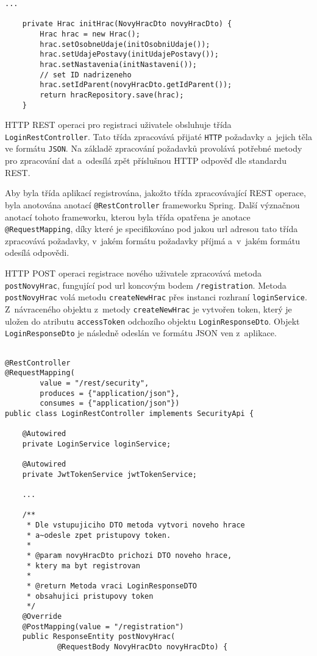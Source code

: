 \documentclass[twoside, 12pt]{article}
\begin{document}
{\begin{lstlisting}
...

    private Hrac initHrac(NovyHracDto novyHracDto) {
        Hrac hrac = new Hrac();
        hrac.setOsobneUdaje(initOsobniUdaje());
        hrac.setUdajePostavy(initUdajePostavy());
        hrac.setNastavenia(initNastaveni());
        // set ID nadrizeneho
        hrac.setIdParent(novyHracDto.getIdParent());
        return hracRepository.save(hrac);
    }
\end{lstlisting}

HTTP REST operaci pro registraci uživatele obsluhuje třída \texttt{LoginRestController}.
Tato třída zpracovává přijaté \texttt{HTTP} požadavky a~jejich těla ve formátu \texttt{JSON}.
Na základě zpracování požadavků provolává potřebné metody pro zpracování dat
a~odesílá zpět příslušnou HTTP odpověď dle standardu REST.

Aby byla třída aplikací registrována, jakožto třída zpracovávající REST operace,
byla anotována anotací \texttt{@RestController} frameworku Spring.
Další význačnou anotací tohoto frameworku, kterou byla třída opatřena je anotace \texttt{@RequestMapping},
díky které je specifikováno pod jakou url adresou tato třída zpracovává požadavky,
v~jakém formátu požadavky příjmá a~v~jakém formátu odesílá odpovědi.

HTTP POST operaci registrace nového uživatele zpracovává metoda \texttt{postNovyHrac},
fungující pod url koncovým bodem \texttt{/registration}.
Metoda \texttt{postNovyHrac} volá metodu \texttt{createNewHrac} přes instanci rozhraní \texttt{loginService}.
Z~návraceného objektu z~metody \texttt{createNewHrac} je vytvořen token,
který je uložen do atributu \texttt{accessToken} odchozího objektu \texttt{LoginResponseDto}.
Objekt \texttt{LoginResponseDto} je následně odeslán ve formátu JSON ven z~aplikace.

\clearpage

\begin{lstlisting}

@RestController
@RequestMapping(
        value = "/rest/security",
        produces = {"application/json"},
        consumes = {"application/json"})
public class LoginRestController implements SecurityApi {

    @Autowired
    private LoginService loginService;

    @Autowired
    private JwtTokenService jwtTokenService;

    ...

    /**
     * Dle vstupujiciho DTO metoda vytvori noveho hrace
     * a~odesle zpet pristupovy token.
     *
     * @param novyHracDto prichozi DTO noveho hrace,
     * ktery ma byt registrovan
     *
     * @return Metoda vraci LoginResponseDTO
     * obsahujici pristupovy token
     */
    @Override
    @PostMapping(value = "/registration")
    public ResponseEntity postNovyHrac(
            @RequestBody NovyHracDto novyHracDto) {


\end{lstlisting}}
\end{document}
